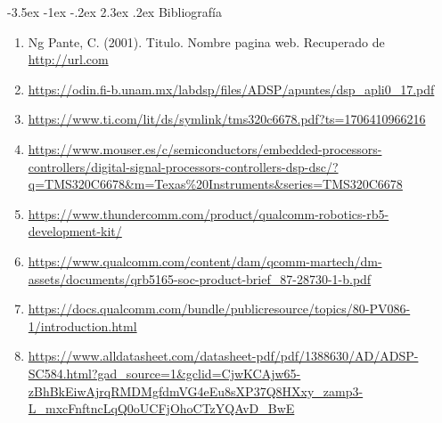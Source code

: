 \documentclass[11pt]{report}
\makeatletter
\renewcommand\chapter{\@startsection{chapter}{0}{\z@}%
    {-3.5ex \@plus -1ex \@minus -.2ex}%
    {2.3ex \@plus.2ex}%
    {\normalfont\Large\bfseries}}
\makeatother
\begin{document}
\chapter{Bibliografía} %
\begin{enumerate}
  \item Ng Pante, C. (2001). Titulo. Nombre pagina web. Recuperado de \url{http://url.com}
  \item \url{https://odin.fi-b.unam.mx/labdsp/files/ADSP/apuntes/dsp_apli0_17.pdf}
  \item \url{https://www.ti.com/lit/ds/symlink/tms320c6678.pdf?ts=1706410966216}
  \item \url{https://www.mouser.es/c/semiconductors/embedded-processors-controllers/digital-signal-processors-controllers-dsp-dsc/?q=TMS320C6678&m=Texas%20Instruments&series=TMS320C6678}
  \item \url{https://www.thundercomm.com/product/qualcomm-robotics-rb5-development-kit/}
  \item \url{https://www.qualcomm.com/content/dam/qcomm-martech/dm-assets/documents/qrb5165-soc-product-brief_87-28730-1-b.pdf}
  \item \url{https://docs.qualcomm.com/bundle/publicresource/topics/80-PV086-1/introduction.html}
  \item \url{https://www.alldatasheet.com/datasheet-pdf/pdf/1388630/AD/ADSP-SC584.html?gad_source=1&gclid=CjwKCAjw65-zBhBkEiwAjrqRMDMgfdmVG4eEu8sXP37Q8HXxy_zamp3-L_mxcFnftncLqQ0oUCFjOhoCTzYQAvD_BwE}
\end{enumerate}
\end{document}
